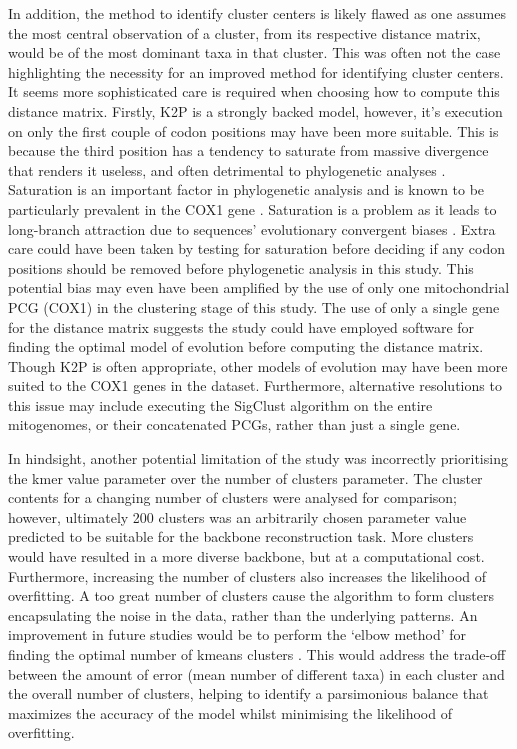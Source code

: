 \documentclass[12pt]{article}
\begin{document}
  In addition, the method to identify cluster centers is likely flawed as one assumes the most central observation of a cluster, from its respective distance matrix, would be of the most dominant taxa in that cluster. This was often not the case highlighting the necessity for an improved method for identifying cluster centers. It seems more sophisticated care is required when choosing how to compute this distance matrix. Firstly, K2P is a strongly backed model, however, it's execution on only the first couple of codon positions may have been more suitable. This is because the third position has a tendency to saturate from massive divergence that renders it useless, and often detrimental to phylogenetic analyses \cite{orlov}. Saturation is an important factor in phylogenetic analysis and is known to be particularly prevalent in the COX1 gene \cite{article}. Saturation is a problem as it leads to long-branch attraction due to sequences' evolutionary convergent biases \cite{Yuan2022}. Extra care could have been taken by testing for saturation \cite{YUAN201699} before deciding if any codon positions should be removed before phylogenetic analysis in this study. This potential bias may even have been amplified by the use of only one mitochondrial PCG (COX1) in the clustering stage of this study. The use of only a single gene for the distance matrix suggests the study could have employed software for finding the optimal model of evolution before computing the distance matrix. Though K2P is often appropriate, other models of evolution may have been more suited to the COX1 genes in the dataset. Furthermore, alternative resolutions to this issue may include executing the SigClust algorithm on the entire mitogenomes, or their concatenated PCGs, rather than just a single gene. 

  In hindsight, another potential limitation of the study was incorrectly prioritising the kmer value parameter over the number of clusters parameter. The cluster contents for a changing number of clusters were analysed for comparison; however, ultimately 200 clusters was an arbitrarily chosen parameter value predicted to be suitable for the backbone reconstruction task. More clusters would have resulted in a more diverse backbone, but at a computational cost. Furthermore, increasing the number of clusters also increases the likelihood of overfitting. A too great number of clusters cause the algorithm to form clusters encapsulating the noise in the data, rather than the underlying patterns. An improvement in future studies would be to perform the `elbow method' for finding the optimal number of kmeans clusters \cite{2020}. This would address the trade-off between the amount of error (mean number of different taxa) in each cluster and the overall number of clusters, helping to identify a parsimonious balance that maximizes the accuracy of the model whilst minimising the likelihood of overfitting. 
\end{document}

